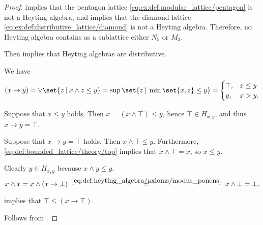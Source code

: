 \begin{proof}
    implies that the pentagon lattice \eqref{eq:ex:def:modular_lattice/pentagon} is not a Heyting algebra, and  implies that the diamond lattice \eqref{eq:ex:def:distributive_lattice/diamond} is not a Heyting algebra. Therefore, no Heyting algebra contains as a sublattice either \( N_5 \) or \( M_3 \).

  Then  implies that Heyting algebras are distributive.

   We have
  \begin{equation*}
    (x \rightarrow y)
    =
    \vee\set{ z \given x \wedge z \leq y }
    =
    \sup\set{ z \given \min\set{ x, z } \leq y }
    =
    \begin{cases}
      \top, &x \leq y \\
      y,    &x > y.
    \end{cases}
  \end{equation*}


  \SufficiencySubProof* Suppose that \( x \leq y \) holds. Then \( x = (x \wedge \top) \leq y \), hence \( \top \in H_{x,y} \), and thus \( x \rightarrow y = \top \).

  \NecessitySubProof* Suppose that \( x \rightarrow y = \top \) holds. Then \( x \wedge \top \leq y \). Furthermore, \eqref{eq:def:bounded_lattice/theory/top} implies that \( x \wedge \top = x \), so \( x \leq y \).

   Clearly \( y \in H_{x,y} \) because \( x \wedge y \leq y \).

  \begin{equation*}
    x \wedge \oline{x}
    =
    x \wedge (x \rightarrow \bot)
    \reloset {\eqref{eq:def:heyting_algebra/axioms/modus_ponens}} =
    x \wedge \bot
    =
    \bot.
  \end{equation*}

    implies that \( \top \leq (x \rightarrow \top) \).

   Follows from .


\end{proof}

